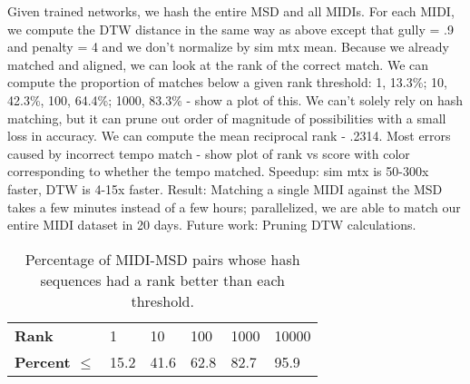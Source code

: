 \documentclass{article}
\begin{document}
Given trained networks, we hash the entire MSD and all MIDIs.
For each MIDI, we compute the DTW distance in the same way as above except that gully = .9 and penalty = 4 and we don't normalize by sim mtx mean.
Because we already matched and aligned, we can look at the rank of the correct match.
We can compute the proportion of matches below a given rank threshold: 1, 13.3\%; 10, 42.3\%, 100, 64.4\%; 1000, 83.3\% - show a plot of this.
We can't solely rely on hash matching, but it can prune out order of magnitude of possibilities with a small loss in accuracy.
We can compute the mean reciprocal rank - .2314.
Most errors caused by incorrect tempo match - show plot of rank vs score with color corresponding to whether the tempo matched.
Speedup: sim mtx is 50-300x faster, DTW is 4-15x faster.
Result: Matching a single MIDI against the MSD takes a few minutes instead of a few hours; parallelized, we are able to match our entire MIDI dataset in 20 days.
Future work: Pruning DTW calculations.

\begin{table}
  \begin{center}
    \begin{tabular}{@{}llllll@{}}
      \toprule
      \textbf{Rank} & 1 & 10 & 100 & 1000 & 10000 \\
      \textbf{Percent $\le$} & 15.2 & 41.6 & 62.8 & 82.7 & 95.9 \\
      \bottomrule
    \end{tabular}
  \end{center}
  \caption{Percentage of MIDI-MSD pairs whose hash sequences had a rank better than each threshold.}
  \label{tab:rank-percentages}
\end{table}


\end{document}
